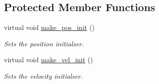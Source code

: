 \subsection*{Protected Member Functions}
\begin{DoxyCompactItemize}
\item 
virtual void \hyperlink{classphysim_1_1emitters_1_1free__emitters_1_1hose_a6c78d604106eb5b8d20021f56f9512ba}{make\+\_\+pos\+\_\+init} ()
\begin{DoxyCompactList}\small\item\em Sets the position initialser. \end{DoxyCompactList}\item 
virtual void \hyperlink{classphysim_1_1emitters_1_1free__emitters_1_1hose_a7976365f9101e4095d00dc8eafc82ebb}{make\+\_\+vel\+\_\+init} ()
\begin{DoxyCompactList}\small\item\em Sets the velocity initialser. \end{DoxyCompactList}\end{DoxyCompactItemize}
